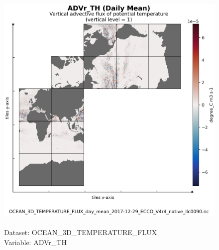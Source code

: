 \begin{figure}[H]
\centering
\includegraphics[scale=0.5]{../images/plots/native_plots/Ocean_Three-Dimensional_Potential_Temperature_Fluxes/ADVr_TH.png}
\caption{\\Dataset: OCEAN\_3D\_TEMPERATURE\_FLUX\\Variable: ADVr\_TH}
\label{tab:table-OCEAN_3D_TEMPERATURE_FLUX_ADVr_TH-Plot}
\end{figure}
\pagebreak
